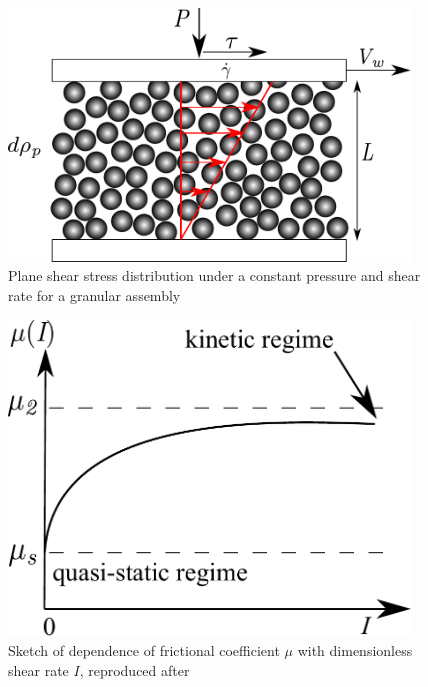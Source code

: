 \begin{figure}[tbhp]
\centering
\includegraphics[width=0.95\textwidth]{Rheology}
\caption{Plane shear stress distribution under a constant pressure and shear 
rate for a granular assembly}
\label{fig:rheology}
\end{figure}

\begin{figure}[tbhp]
\centering
\includegraphics[width=0.95\textwidth]{mu}
\caption[Dependence of frictional coefficient $\mu$ with dimensionless shear 
rate $\textit{I}$]{Sketch of dependence of frictional coefficient $\mu$ with 
dimensionless shear rate $\textit{I}$, reproduced after ~\citet{Pouliquen2006}}
\label{fig:mu}
\end{figure}

